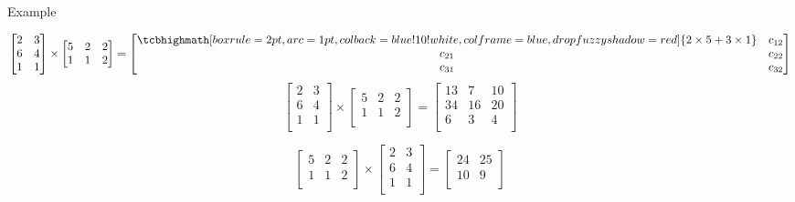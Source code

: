 \documentclass{scrartcl}
\begin{document}
\begin{frame}{Example}
\protect\hypertarget{example}{}

\[
\begin{bmatrix}2&3 \\6&4 \\1&1 \\\end{bmatrix} \times \begin{bmatrix}5&2&2 \\1&1&2 \\\end{bmatrix}  =  \begin{bmatrix} \tcbhighmath[boxrule=2pt,arc=1pt,colback=blue!10!white,colframe=blue,
  drop fuzzy shadow=red]{ 2\times 5+3\times 1 }& c_{12}\\
c_{21}& c_{22}\\
c_{31}& c_{32}
\end{bmatrix}
\] \[
\begin{bmatrix}2&3 \\6&4 \\1&1 \\\end{bmatrix} \times \begin{bmatrix}5&2&2 \\1&1&2 \\\end{bmatrix}  =  \begin{bmatrix}13&7&10 \\34&16&20 \\6&3&4 \\\end{bmatrix}
\]

\[
\begin{bmatrix}5&2&2 \\1&1&2 \\\end{bmatrix} \times \begin{bmatrix}2&3 \\6&4 \\1&1 \\\end{bmatrix}  =  \begin{bmatrix}24&25 \\10&9 \\\end{bmatrix}
\]

\end{frame}
\end{document}
